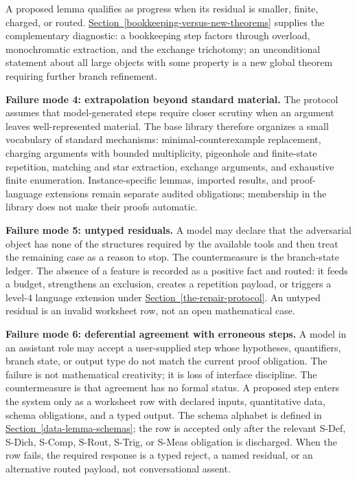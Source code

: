 \documentclass[
  11pt,
]{article}
\theoremstyle{definition}
\newcommand{\secref}[1]{\hyperref[#1]{Section~\ref*{#1}}}
\begin{document}
A proposed lemma qualifies as progress when its residual is smaller,
finite, charged, or routed. \secref{bookkeeping-versus-new-theorems} supplies the complementary
diagnostic: a bookkeeping step factors through overload, monochromatic
extraction, and the exchange trichotomy; an unconditional statement
about all large objects with some property is a new global theorem
requiring further branch refinement.

\textbf{Failure mode 4: extrapolation beyond standard material.}
The protocol assumes that model-generated steps require closer scrutiny
when an argument leaves well-represented material. The base library
therefore organizes a small vocabulary of standard mechanisms:
minimal-counterexample replacement, charging
arguments with bounded multiplicity, pigeonhole and finite-state
repetition, matching and star extraction, exchange arguments, and
exhaustive finite enumeration. Instance-specific lemmas, imported
results, and proof-language extensions remain separate audited
obligations; membership in the library does not make their proofs
automatic.

\textbf{Failure mode 5: untyped residuals.} A model may declare that
the adversarial object has none of the structures required by the
available tools and then treat the remaining case as a reason to stop.
The countermeasure is the branch-state ledger. The absence of a feature
is recorded as a positive fact and routed: it feeds a budget, strengthens
an exclusion, creates a repetition payload, or triggers a level-4
language extension under \secref{the-repair-protocol}. An untyped residual is an invalid
worksheet row, not an open mathematical case.

\textbf{Failure mode 6: deferential agreement with erroneous steps.} A
model in an assistant role may accept a user-supplied step whose
hypotheses, quantifiers, branch state, or output type do not match the
current proof obligation. The failure is not mathematical creativity; it
is loss of interface discipline. The countermeasure is that agreement
has no formal status. A proposed step enters the system only as a
worksheet row with declared inputs, quantitative data, schema
obligations, and a typed output. The schema alphabet is defined in
\secref{data-lemma-schemas}; the row is accepted only after the relevant
S-Def, S-Dich, S-Comp, S-Rout, S-Trig, or S-Meas obligation is
discharged. When the row fails, the required response is a typed reject,
a named residual, or an alternative routed payload, not conversational
assent.
\end{document}
